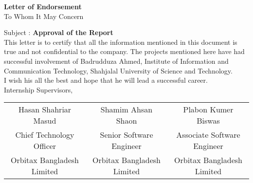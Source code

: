 \vspace{\fill}
\begin{center}
\begin{large}
\textbf{Letter of Endorsement}\\
\small To Whom It May Concern


\vspace{2cm}
\end{large}
\end{center}
\begin{flushleft}
Subject : \textbf{Approval of the Report
}\\\vspace{10pt}
This letter is to certify that all the information mentioned in this document is true and not confidential to the company. The projects mentioned here have had successful involvement of Badrudduza Ahmed, Institute of Information and Communication Technology, Shahjalal University of Science and Technology.\\
\vspace{15pt}
I wish his all the best and hope that he will lead a successful career.\\
\vspace{50pt}
Internship Supervisors,\\ \vspace{40pt}
\end{flushleft}

\begin{flushleft}
\footnotesize
\addtolength{\tabcolsep}{15pt}
\begin{tabular}{ c c c }\\  
 Hasan Shahriar Masud
 & Shamim Ahsan Shaon
 &Plabon Kumer Biswas
 \\ 
 Chief Technology Officer & Senior Software Engineer
 & Associate Software Engineer \\  
 Orbitax Bangladesh Limited
 &Orbitax Bangladesh Limited
 & Orbitax Bangladesh Limited
   
\end{tabular}
\addtolength{\tabcolsep}{15pt}
\end{flushleft}
